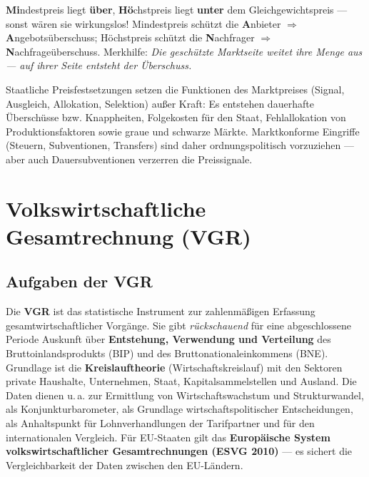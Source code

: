 \documentclass[11pt, a4paper]{article}
\begin{document}
\begin{eselsbruecke}
\textbf{Mi}ndestpreis liegt \textbf{über}, \textbf{Hö}chstpreis liegt \textbf{unter} dem
Gleichgewichtspreis --- sonst wären sie wirkungslos! Mindestpreis schützt die
\textbf{A}nbieter $\Rightarrow$ \textbf{A}ngebotsüberschuss; Höchstpreis schützt die
\textbf{N}achfrager $\Rightarrow$ \textbf{N}achfrageüberschuss. Merkhilfe: \emph{Die
geschützte Marktseite weitet ihre Menge aus --- auf ihrer Seite entsteht der Überschuss.}
\end{eselsbruecke}

\begin{merksatz}[title={\bfseries Beurteilung staatlicher Preiseingriffe (prüfungsrelevant!)}]
Staatliche Preisfestsetzungen setzen die Funktionen des Marktpreises (Signal, Ausgleich,
Allokation, Selektion) außer Kraft: Es entstehen dauerhafte Überschüsse bzw. Knappheiten,
Folgekosten für den Staat, Fehlallokation von Produktionsfaktoren sowie graue und schwarze
Märkte. Marktkonforme Eingriffe (Steuern, Subventionen, Transfers) sind daher
ordnungspolitisch vorzuziehen --- aber auch Dauersubventionen verzerren die Preissignale.
\end{merksatz}

\section{Volkswirtschaftliche Gesamtrechnung (VGR)}

\subsection{Aufgaben der VGR}

Die \textbf{VGR} ist das statistische Instrument zur zahlenmäßigen Erfassung
gesamtwirtschaftlicher Vorgänge. Sie gibt \emph{rückschauend} für eine abgeschlossene
Periode Auskunft über \textbf{Entstehung, Verwendung und Verteilung} des
Bruttoinlandsprodukts (BIP) und des Bruttonationaleinkommens (BNE). Grundlage ist die
\textbf{Kreislauftheorie} (Wirtschaftskreislauf) mit den Sektoren private Haushalte,
Unternehmen, Staat, Kapitalsammelstellen und Ausland. Die Daten dienen u.\,a. zur
Ermittlung von Wirtschaftswachstum und Strukturwandel, als Konjunkturbarometer, als
Grundlage wirtschaftspolitischer Entscheidungen, als Anhaltspunkt für Lohnverhandlungen
der Tarifpartner und für den internationalen Vergleich. Für EU-Staaten gilt das
\textbf{Europäische System volkswirtschaftlicher Gesamtrechnungen (ESVG 2010)} --- es
sichert die Vergleichbarkeit der Daten zwischen den EU-Ländern.
\end{document}
